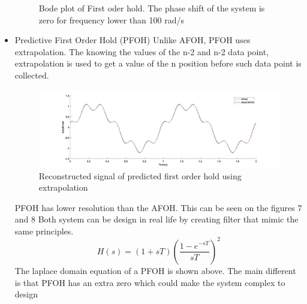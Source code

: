 \documentclass[12pt,letterpaper]{article}
\begin{document}
\begin{itemize}
\begin{figure}[h]
            \caption{Bode plot of First oder hold. The phase shift
            of the system is zero for frequency lower than 100 rad/s}
    \end{figure}
    \item Predictive First Order Hold (PFOH)
    Unlike  AFOH, PFOH uses extrapolation. The knowing the values of the
    n-2 and n-2 data point, extrapolation is used to get a value of the n position before 
    such data point is collected. 
    \begin{figure}[h]
        \centering
            \includegraphics[width=15cm]{PFOH.jpg}
            \caption{Reconstructed signal of predicted first order hold using extrapolation}
    \end{figure}
    PFOH  has lower resolution than the AFOH. This can be seen on the figures 7 and 8
    Both system can be design in real life by creating filter that 
    mimic the same principles. 
    \begin{equation}
        H(s)=(1+sT)(\frac{1-e^{-sT}}{sT})^2
    \end{equation}
    The laplace domain equation of a PFOH is shown above. The main different is that
    PFOH has an extra zero which could make the system complex to design
\end{itemize}
\end{document}
